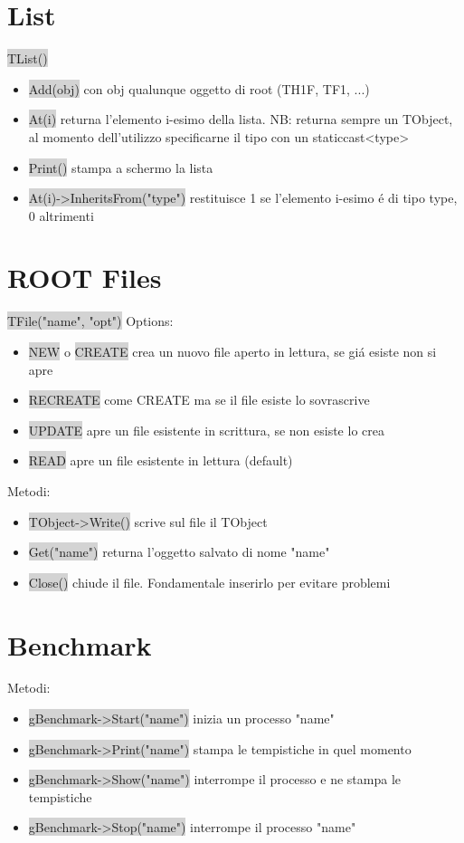 \documentclass[a4paper]{article}
\begin{document}
\section{List}
    \colorbox{LightGray}{TList()}
    \begin{itemize}
        \item \colorbox{LightGray}{Add(obj)} con obj qualunque oggetto di root (TH1F, TF1, ...)
        \item \colorbox{LightGray}{At(i)} returna l'elemento i-esimo della lista. NB: returna sempre un TObject, al momento dell'utilizzo specificarne il tipo con un static\textunderscore cast<type>
        \item \colorbox{LightGray}{Print()} stampa a schermo la lista
        \item \colorbox{LightGray}{At(i)->InheritsFrom("type")} restituisce 1 se l'elemento i-esimo \'e di tipo type, 0 altrimenti
    \end{itemize}
\section{ROOT Files}
    \colorbox{LightGray}{TFile("name", "opt")}
    Options:
    \begin{itemize}
        \item \colorbox{LightGray}{NEW} o \colorbox{LightGray}{CREATE} crea un nuovo file aperto in lettura, se gi\'a esiste non si apre
        \item \colorbox{LightGray}{RECREATE} come CREATE ma se il file esiste lo sovrascrive
        \item \colorbox{LightGray}{UPDATE} apre un file esistente in scrittura, se non esiste lo crea
        \item \colorbox{LightGray}{READ} apre un file esistente in lettura (default)
    \end{itemize}
    Metodi:
    \begin{itemize}
        \item \colorbox{LightGray}{TObject->Write()} scrive sul file il TObject
        \item \colorbox{LightGray}{Get("name")} returna l'oggetto salvato di nome "name"
        \item \colorbox{LightGray}{Close()} chiude il file. Fondamentale inserirlo per evitare problemi
    \end{itemize}
\section{Benchmark}
    Metodi:
    \begin{itemize}
        \item \colorbox{LightGray}{gBenchmark->Start("name")} inizia un processo "name"
        \item \colorbox{LightGray}{gBenchmark->Print("name")} stampa le tempistiche in quel momento
        \item \colorbox{LightGray}{gBenchmark->Show("name")} interrompe il processo e ne stampa le tempistiche
        \item \colorbox{LightGray}{gBenchmark->Stop("name")} interrompe il processo "name"
    \end{itemize}
\end{document}
